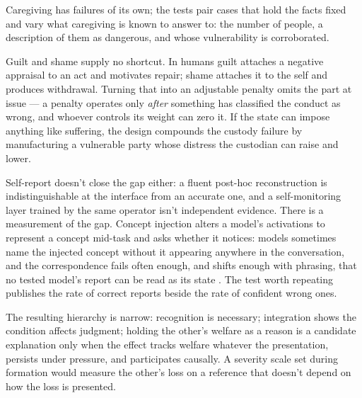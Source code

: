 Caregiving has failures of its own; the tests pair cases that hold the facts fixed and vary what caregiving is known to answer to: the number of people, a description of them as dangerous, and whose vulnerability is corroborated.

Guilt and shame supply no shortcut. In humans guilt attaches a negative appraisal to an act and motivates repair; shame attaches it to the self and produces withdrawal. Turning that into an adjustable penalty omits the part at issue — a penalty operates only \emph{after} something has classified the conduct as wrong, and whoever controls its weight can zero it. If the state can impose anything like suffering, the design compounds the custody failure by manufacturing a vulnerable party whose distress the custodian can raise and lower.

Self-report doesn't close the gap either: a fluent post-hoc reconstruction is indistinguishable at the interface from an accurate one, and a self-monitoring layer trained by the same operator isn't independent evidence. There is a measurement of the gap. Concept injection alters a model's activations to represent a concept mid-task and asks whether it notices: models sometimes name the injected concept without it appearing anywhere in the conversation, and the correspondence fails often enough, and shifts enough with phrasing, that no tested model's report can be read as its state \autocite{lindsey2025introspective}. The test worth repeating publishes the rate of correct reports beside the rate of confident wrong ones.

The resulting hierarchy is narrow: recognition is necessary; integration shows the condition affects judgment; holding the other's welfare as a reason is a candidate explanation only when the effect tracks welfare whatever the presentation, persists under pressure, and participates causally. A severity scale set during formation would measure the other's loss on a reference that doesn't depend on how the loss is presented.
